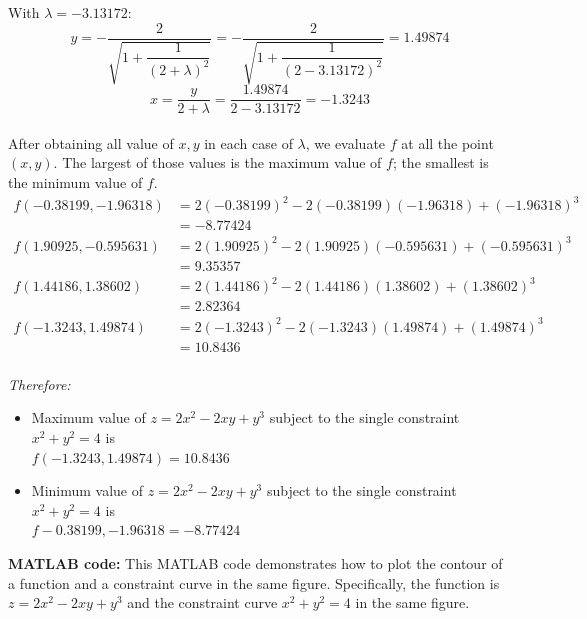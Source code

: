 With $\lambda =-3.13172$: 
$$ y = -\dfrac{2}{ \sqrt{1 + \dfrac{1}{(2 + \lambda)^2}} } = -\dfrac{2}{ \sqrt{1 + \dfrac{1}{(2 -3.13172)^2}} } = 1.49874$$
$$ x = \dfrac{y}{2 + \lambda} = \dfrac{1.49874}{2 -3.13172} = -1.3243 $$\\[6pt]

After obtaining all value of $x, y$ in each case of $\lambda$, we evaluate $f$ at all the point $(x,y)$. The largest of those values is the maximum value of $f$; the smallest is the minimum value of $f$.
\begin{align*}
  f(-0.38199,-1.96318)
    &=2(-0.38199)^2-2(-0.38199)(-1.96318)+(-1.96318)^3\\
    &=-8.77424\\[6pt]
  f(1.90925,-0.595631)
    &=2(1.90925)^2-2(1.90925)(-0.595631)+(-0.595631)^3\\
    &=9.35357\\[6pt]
  f(1.44186,1.38602)
    &=2(1.44186 )^2-2(1.44186 )(1.38602)+(1.38602)^3\\
    &=2.82364\\[6pt]
  f(-1.3243,1.49874)
    &=2(-1.3243 )^2-2(-1.3243 )(1.49874)+(1.49874)^3\\
    &=10.8436\\[6pt]
\end{align*}

\textit{Therefore: }
\begin{itemize}
  \item Maximum value of $z = 2x^2 - 2xy + y^3$ subject to the single constraint $x^2 + y^2 = 4$ is \\
        $f(-1.3243,1.49874) = 10.8436$
  \item Minimum value of $z = 2x^2 - 2xy + y^3$ subject to the single constraint $x^2 + y^2 = 4$ is \\
        $f-0.38199,-1.96318=-8.77424$
\end{itemize}

\vspace*{1cm}

\textbf{MATLAB code: }
This MATLAB code demonstrates how to plot the contour of a function and a constraint curve in the same figure. Specifically, the function is $z = 2x^2-2xy+y^3$ and the constraint curve $x^2 + y^2 = 4$ in the same figure.

